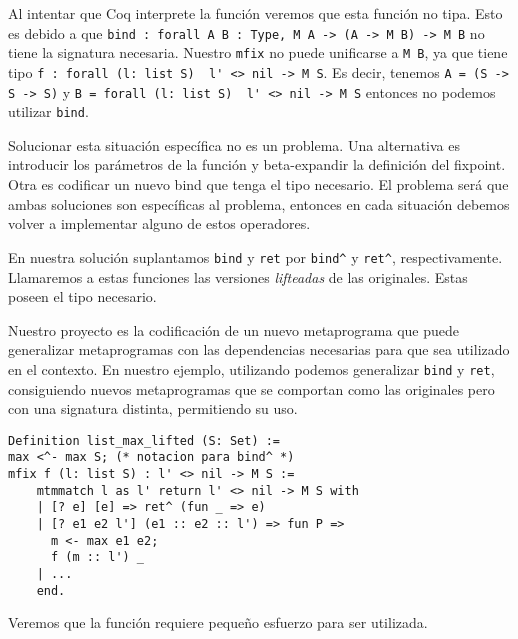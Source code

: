 Al intentar que Coq interprete la función veremos que esta función no tipa.
Esto es debido a que \lstinline{bind : forall A B : Type, M A -> (A -> M B) -> M B} no tiene la signatura necesaria.
Nuestro \lstinline{mfix} no puede unificarse a \lstinline{M B}, ya que tiene
tipo \lstinline{f : forall (l: list S)  l' <> nil -> M S}.
Es decir, tenemos \lstinline{A = (S -> S -> S)} y \lstinline{B = forall (l: list S)  l' <> nil -> M S} entonces no podemos utilizar \lstinline{bind}.

Solucionar esta situación específica no es un problema.
Una alternativa es introducir los parámetros de la función y beta-expandir la definición del fixpoint.
Otra es codificar un nuevo bind que tenga el tipo necesario.
El problema será que ambas soluciones son específicas al problema, entonces en cada situación debemos volver a implementar alguno de estos operadores.

En nuestra solución suplantamos \lstinline{bind} y \lstinline{ret} por \lstinline{bind^} y \lstinline{ret^}, respectivamente. Llamaremos a estas funciones las versiones \emph{lifteadas} de las originales. Estas poseen el tipo necesario.

Nuestro proyecto es la codificación de un nuevo metaprograma \lift que puede generalizar metaprogramas con las dependencias necesarias para que sea utilizado en el contexto.
En nuestro ejemplo, utilizando \lift podemos generalizar \lstinline{bind} y \lstinline{ret}, consiguiendo nuevos metaprogramas que se comportan como las originales pero con una signatura distinta, permitiendo su uso.

\begin{lstlisting}[frame=tb,caption={Función \lstinline{list_max} lifteada},label=lst:list_max_lifted]
Definition list_max_lifted (S: Set) :=
max <^- max S; (* notacion para bind^ *)
mfix f (l: list S) : l' <> nil -> M S :=
    mtmmatch l as l' return l' <> nil -> M S with
    | [? e] [e] => ret^ (fun _ => e)
    | [? e1 e2 l'] (e1 :: e2 :: l') => fun P =>
      m <- max e1 e2;
      f (m :: l') _
    | ...
    end.
\end{lstlisting}

Veremos que la función \lift requiere pequeño esfuerzo para ser utilizada.